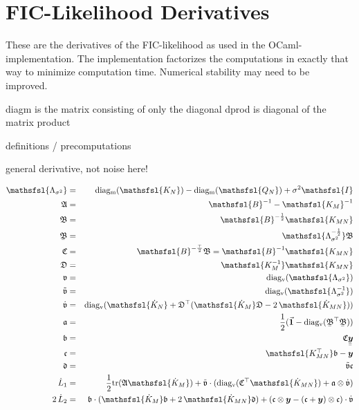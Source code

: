 \documentclass[12pt]{article}
\newcommand{\mat}[1]{\mbox{$\mathsfsl{#1}$}}
\newcommand{\myvec}[1]{\mbox{\boldmath$#1$}}
\newcommand{\diagv}[1]{\mathrm{diag_v}(#1)}
\newcommand{\diagm}[1]{\mathrm{diag_m}(#1)}
\newcommand{\trace}[1]{\mathrm{tr}(#1)}
\newcommand{\trans}[1]{#1^\top}
\newcommand{\inv}[1]{#1^{-1}}
\newcommand{\ichol}[1]{#1^{-\frac{1}{2}}}
\newcommand{\myu}[1]{\underaccent{\bar}{#1}}
\newcommand{\myuu}[1]{\myu{\myu{#1}}}
\newcommand{\ikm}{\mat{K_M^{-1}}}
\newcommand{\dkm}{\mat{\dot{K}_M}}
\newcommand{\dkn}{\mat{\dot{K}_N}}
\newcommand{\kmn}{\mat{K_{MN}}}
\newcommand{\knm}{\mat{K_{MN}^\top}}
\newcommand{\dkmn}{\mat{\dot{K}_{MN}}}
\newcommand{\myv}{\mathfrak{v}}
\newcommand{\mydv}{\dot{\myv}}
\newcommand{\myiv}{\tilde{\mathfrak{v}}}
\newcommand{\Lamss}{\mat{\Lambda_{\sigma^2}}}
\newcommand{\iLamss}{\mat{\Lambda_{\sigma^2}^{-1}}}
\newcommand{\Lamsr}{\mat{\Lambda_{\sigma^2}^{-\frac{1}{2}}}}
\begin{document}
\section{FIC-Likelihood Derivatives}

These are the derivatives of the FIC-likelihood as used in the
OCaml-implementation.  The implementation factorizes the computations
in exactly that way to minimize computation time.  Numerical stability
may need to be improved.

diagm is the matrix consisting of only the diagonal
dprod is diagonal of the matrix product

definitions / precomputations

general derivative, not noise here!

\begin{eqnarray*}
\Lamss & = & \diagm{\mat{K_N}} - \diagm{\mat{Q_N}} + \sigma^2\mat{I} \\
\mathfrak{A} & = & \mat{B}^{-1} - \mat{K_M}^{-1} \\
\mathfrak{B} & = & \ichol{\mat{B}}\kmn \\
\myu{\mathfrak{B}} & = & \Lamsr\mathfrak{B} \\
\mathfrak{C} & = & \mat{B}^{-\frac{\top}{2}}\mathfrak{B} = \inv{\mat{B}}\kmn \\
\mathfrak{D} & = & \ikm\kmn \\
\myv & = & \diagv{\Lamss} \\
\myiv & = & \diagv{\iLamss} \\
\mydv & = & \diagv{\dkn + \trans{\mathfrak{D}}(\dkm\mathfrak{D} - 2\,\dkmn)} \\
\mathfrak{a} & = & \frac{1}{2}(\vec{\mathbf{1}}-\diagv{\trans{\myu{\mathfrak{B}}}\myu{\mathfrak{B}}}) \\
\mathfrak{b} & = & \mathfrak{C} \myuu{\myvec{y}} \\
\mathfrak{c} & = & \knm\mathfrak{b} - \myvec{y} \\
\mathfrak{d} & = & \myiv\mathfrak{c} \\
\dot{L}_1 & = & \frac{1}{2}\trace{\mathfrak{A}\dkm} + \myiv\cdot(\diagv{\trans{\mathfrak{C}}\dkmn} + \mathfrak{a}\otimes\mydv) \\
2\,\dot{L}_2 & = & \mathfrak{b}\cdot(\dkm\mathfrak{b} + 2\,\dkmn\mathfrak{d})
  + (\mathfrak{c}\otimes\myvec{y} - (\mathfrak{c} + \myvec{y}) \otimes \mathfrak{c})\cdot\mydv \\
\end{eqnarray*}
\end{document}
